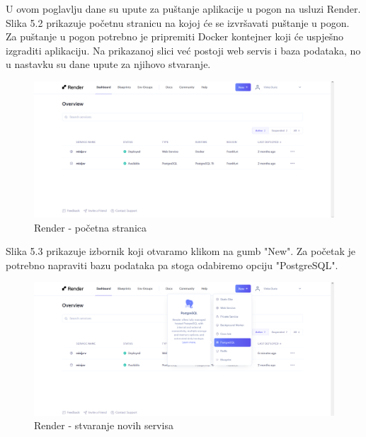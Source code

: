 			

			\hspace*{6mm}U ovom poglavlju dane su upute za puštanje aplikacije u pogon na usluzi Render. Slika 5.2 prikazuje početnu stranicu na kojoj će se izvršavati puštanje u pogon. Za puštanje u pogon potrebno je pripremiti Docker kontejner koji će uspješno izgraditi aplikaciju. Na prikazanoj slici već postoji web servis i baza podataka, no u nastavku su dane upute za njihovo stvaranje. 

			\begin{figure}[H]
				\includegraphics[width=\textwidth]{slike/deploy1.PNG}
				\caption{Render - početna stranica}
				\label{fig:deployment1}
			\end{figure}
			
			Slika 5.3 prikazuje izbornik koji otvaramo klikom na gumb "New". Za početak je potrebno napraviti bazu podataka pa stoga odabiremo opciju "PostgreSQL".
			
			\begin{figure}[H]
				\includegraphics[width=\textwidth]{slike/deploy2.PNG}
				\caption{Render - stvaranje novih servisa}
				\label{fig:deployment2}
			\end{figure}
			
